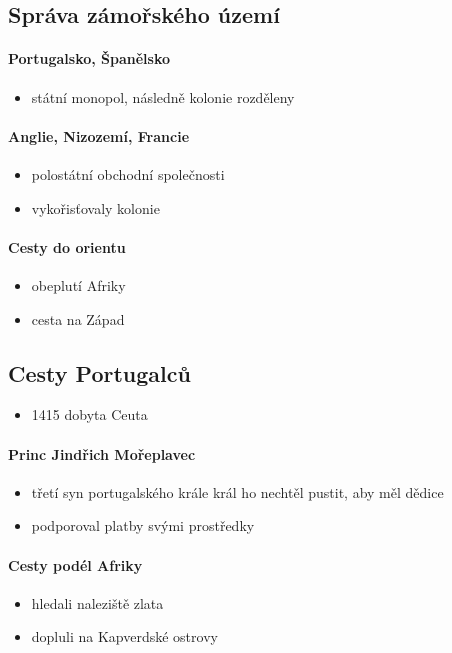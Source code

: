 \subsection{Správa zámořského území}
\paragraph{Portugalsko, Španělsko}
\begin{itemize}
\item státní monopol, následně kolonie rozděleny
\end{itemize}

\paragraph{Anglie, Nizozemí, Francie}
\begin{itemize}
\item polostátní obchodní společnosti
\item vykořisťovaly kolonie
\end{itemize}

\paragraph{Cesty do orientu}
\begin{itemize}
\item obeplutí Afriky
\item cesta na Západ
\end{itemize}

\subsection{Cesty Portugalců}
\begin{itemize}
\item 1415 dobyta Ceuta
\end{itemize}

\paragraph{Princ Jindřich Mořeplavec}
\begin{itemize}
\item třetí syn portugalského krále \ra král ho nechtěl pustit, aby měl dědice
\item podporoval platby svými prostředky
\end{itemize}

\paragraph{Cesty podél Afriky}
\begin{itemize}
\item hledali naleziště zlata
\item dopluli na Kapverdské ostrovy
\end{itemize}

